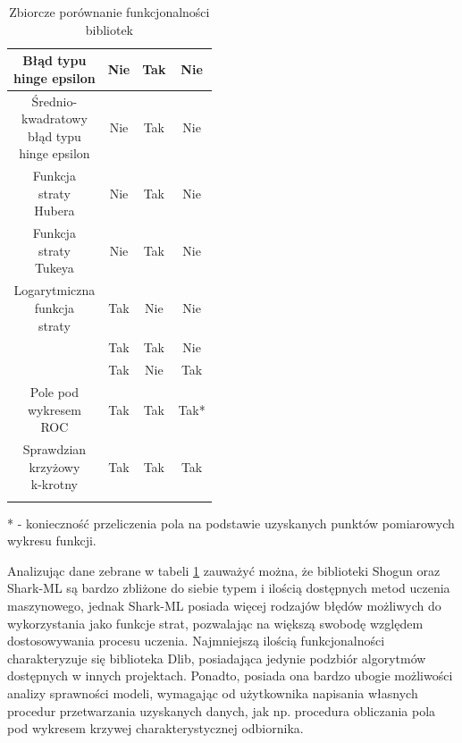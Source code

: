 \begin{longtable}{c | c | c | c}
	\hline
	\makecell{Błąd typu \\ hinge epsilon} & Nie & Tak & Nie\\
	\hline
	\makecell{Średnio-\\kwadratowy \\ błąd typu \\ hinge epsilon} & Nie & Tak & Nie\\
	\hline
	\makecell{Funkcja \\ straty \\ Hubera} & Nie & Tak & Nie\\
	\hline
	\makecell{Funkcja \\ straty \\ Tukeya} & Nie & Tak & Nie\\
	\hline
	\makecell{Logarytmiczna \\ funkcja \\ straty} & Tak & Nie & Nie\\
	\hline
	\makecell{Metryka $R^2$} & Tak & Tak & Nie\\
	\hline
	\makecell{Dokładność} & Tak & Nie & Tak \\
	\hline
	\makecell{Pole pod \\ wykresem \\ ROC} & Tak & Tak & Tak* \\
	\hline
	\makecell{Sprawdzian \\ krzyżowy \\ k-krotny} & Tak & Tak & Tak \\
	\caption{Zbiorcze porównanie funkcjonalności bibliotek}
	\label{fun:sum}
\end{longtable} 

* - konieczność przeliczenia pola na podstawie uzyskanych punktów pomiarowych wykresu funkcji.

Analizując dane zebrane w tabeli \ref{fun:sum} zauważyć można, że biblioteki Shogun oraz Shark-ML są bardzo zbliżone do siebie typem i ilością dostępnych metod uczenia maszynowego, jednak Shark-ML posiada więcej rodzajów błędów możliwych do wykorzystania jako funkcje strat, pozwalając na większą swobodę względem dostosowywania procesu uczenia. Najmniejszą ilością funkcjonalności charakteryzuje się biblioteka Dlib, posiadająca jedynie podzbiór algorytmów dostępnych w innych projektach. Ponadto, posiada ona bardzo ubogie możliwości analizy sprawności modeli, wymagając od użytkownika napisania własnych procedur przetwarzania uzyskanych danych, jak np. procedura obliczania pola pod wykresem krzywej charakterystycznej odbiornika.

